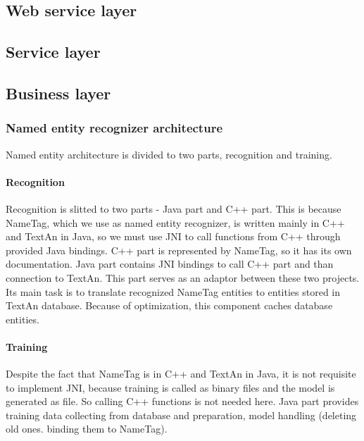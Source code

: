 
\subsection{Web service layer}


\subsection{Service layer}


\subsection{Business layer}


\subsubsection{Named entity recognizer architecture}

Named entity architecture is divided to two parts, recognition and training.
\paragraph{Recognition} 
Recognition is slitted to two parts - Java part and C++ part. This is because
NameTag, which we use as named entity recognizer, is written mainly in C++ and
TextAn in Java, so we must use JNI to call functions from C++ through provided
Java bindings. C++ part is represented by NameTag, so it has its own documentation.
Java part contains JNI bindings to call C++ part and than connection to TextAn.
This part serves as an adaptor between these two projects. Its main task is
to translate recognized NameTag entities to entities stored in TextAn database.
Because of optimization, this component caches database entities.

\paragraph{Training}
Despite the fact that NameTag is in C++ and TextAn in Java, it is not requisite 
to implement JNI, because training is called as binary files and the model is generated
as file. So calling C++ functions is not needed here. Java part provides
training data collecting from database and preparation, model handling
(deleting old ones. binding them to NameTag).

